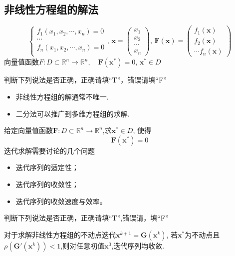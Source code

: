 \subsection{非线性方程组的解法}
\[
    \begin{cases}
        f_1(x_1,x_2,\cdots,x_n) = 0\\
        \cdots\\
        f_n(x_1,x_2,\cdots,x_n) = 0\\
    \end{cases},\,
    \boldsymbol{x} = \begin{pmatrix}
        x_1\\x_2\\\cdots\\x_n
    \end{pmatrix},\,
    \boldsymbol{F}(\boldsymbol{x}) = \begin{pmatrix}
        f_1(\boldsymbol{x})\\f_{2}(\boldsymbol{x})\\\cdots f_{n}(\boldsymbol{x})
    \end{pmatrix}
\]
向量值函数$F:D\subset\mathbb{R}^n\to\mathbb{R}^n,\quad \boldsymbol{F}(\boldsymbol{x}^*)=0,\, \boldsymbol{x}^*\in D$
\begin{example}
    判断下列说法是否正确，正确请填“T”，错误请填“F”
    \begin{itemize}
        \item 非线性方程组的解通常不唯一. 
        \item 二分法可以推广到多维方程组的求解.
    \end{itemize}
\end{example}
给定向量值函数$\boldsymbol{F}:D\subset\mathbb{R}^n\to\mathbb{R}^n$,求$\boldsymbol{x}^*\in D$,
使得
\[
    \boldsymbol{F}(\boldsymbol{x}^*)=0
\]
迭代求解需要讨论的几个问题
\begin{itemize}
    \item 迭代序列的适定性；
    \item 迭代序列的收敛性；
    \item 迭代序列的收敛速度与效率。
\end{itemize}
\begin{example}
    判断下列说法是否正确，正确请填“T”,错误请，填“F”

    对于求解非线性方程组的不动点迭代$\boldsymbol{x}^{k+1}=\boldsymbol{G}( \boldsymbol{x}^{k}) $, 若$ \boldsymbol{x}^{* }$为不动点且$\rho(\boldsymbol{G}'( \boldsymbol{x}^{k}))<1$,则对任意初值$\boldsymbol{x}^{0}$,迭代序列均收敛.
\end{example}
